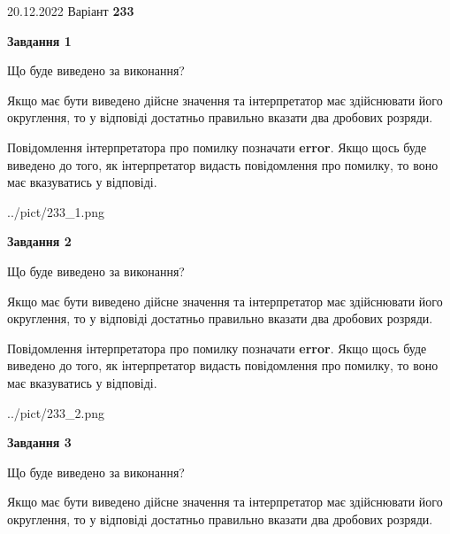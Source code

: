 \documentclass[12pt, ukrainian]{article}
\begin{document}
{20.12.2022 Варіант \No \textbf { 233 }\par}
{
\begin {Large}

{\begin {center}\textbf{Завдання 1}\end {center}}\par
Що буде виведено за виконання? \par

Якщо має бути виведено дійсне значення та інтерпретатор має здійснювати його округлення, 
то у відповіді достатньо правильно вказати два дробових розряди.

Повідомлення інтерпретатора про помилку позначати \textbf{error}.
Якщо щось буде виведено до того, як інтерпретатор видасть повідомлення про помилку, 
то воно має вказуватись у відповіді. \par

\begin{center}
	{../pict/233_1.png}
\end{center}
\newpage

{\begin {center}\textbf{Завдання 2}\end {center}}\par
Що буде виведено за виконання? \par

Якщо має бути виведено дійсне значення та інтерпретатор має здійснювати його округлення, 
то у відповіді достатньо правильно вказати два дробових розряди.

Повідомлення інтерпретатора про помилку позначати \textbf{error}.
Якщо щось буде виведено до того, як інтерпретатор видасть повідомлення про помилку, 
то воно має вказуватись у відповіді. \par

\begin{center}
	{../pict/233_2.png}
\end{center}
\newpage

{\begin {center}\textbf{Завдання 3}\end {center}}\par
Що буде виведено за виконання? \par

Якщо має бути виведено дійсне значення та інтерпретатор має здійснювати його округлення, 
то у відповіді достатньо правильно вказати два дробових розряди.


\end{Large}}
\end{document}
